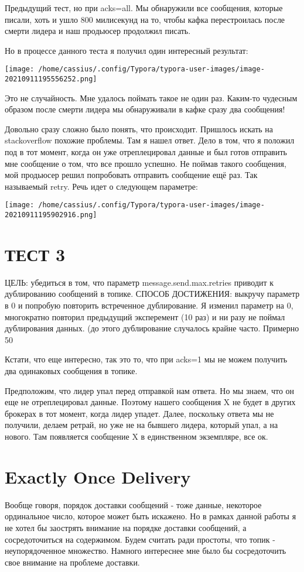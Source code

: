 \documentclass[11pt]{article}
\begin{document}
    Предыдущий тест, но при acks=all. Мы обнаружили все сообщения, которые писали, хоть и ушло 800 милисекунд на то, чтобы кафка перестроилась после смерти лидера и наш продьюсер продолжил писать.

    Но в процессе данного теста я получил один интересный результат:

    \texttt{[image: /home/cassius/.config/Typora/typora-user-images/image-20210911195556252.png]}

    Это не случайность. Мне удалось поймать такое не один раз. Каким-то чудесным образом после смерти лидера мы обнаруживали в кафке сразу два сообщения!

    Довольно сразу сложно было понять, что происходит. Пришлось искать на stackoverflow похожие проблемы. Там я нашел ответ. Дело в том, что я положил под в тот момент, когда он уже отреплецировал данные и был готов отправить мне сообщение о том, что все прошло успешно. Не поймав такого сообщения, мой продьюсер решил попробовать отправить сообщение ещё раз. Так называемый retry. Речь идет о следующем параметре:

    \texttt{[image: /home/cassius/.config/Typora/typora-user-images/image-20210911195902916.png]}
    
    \section{ТЕСТ 3}
    ЦЕЛЬ: убедиться в том, что параметр message.send.max.retries приводит к дублированию сообщений в топике.
    СПОСОБ ДОСТИЖЕНИЯ: выкручу параметр в 0 и попробую повторить встреченное дублирование.
    Я изменил параметр на 0, многократно повторил предыдущий эксперемент (10 раз) и ни разу не поймал дублирования данных. (до этого дублирование случалось крайне часто. Примерно 50%

    Кстати, что еще интересно, так это то, что при acks=1 мы не можем получить два одинаковых сообщения в топике.

    Предположим, что лидер упал перед отправкой нам ответа. Но мы знаем, что он еще не отреплецировал данные. Поэтому нашего сообщения X не будет в других брокерах в тот момент, когда лидер упадет. Далее, поскольку ответа мы не получили, делаем ретрай, но уже не на бывшего лидера, который упал, а на нового. Там появляется сообщение X в единственном  экземпляре, все ок.

    \section{Exactly Once Delivery}
    Вообще говоря, порядок доставки сообщений - тоже данные, некоторое ординальное число, которое может быть искажено. Но в рамках данной работы я не хотел бы заострять внимание на порядке доставки сообщений, а сосредоточиться на содержимом. Будем считать ради простоты, что топик - неупорядоченное множество. Намного интереснее мне было бы сосредоточить свое внимание на проблеме доставки.
\end{document}
